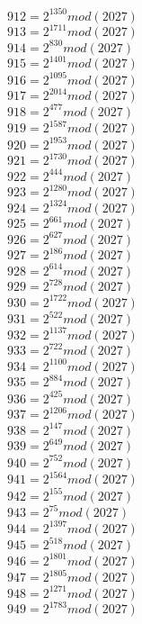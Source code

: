 \documentclass[12pt, letterpaper]{article}
\begin{document}
\begin{itemize}
\begin{multicols}{3}
$912= 2^{1350} mod (2027)$\\
$913= 2^{1711} mod (2027)$\\
$914= 2^{830} mod (2027)$\\
$915= 2^{1401} mod (2027)$\\
$916= 2^{1095} mod (2027)$\\
$917= 2^{2014} mod (2027)$\\
$918= 2^{477} mod (2027)$\\
$919= 2^{1587} mod (2027)$\\
$920= 2^{1953} mod (2027)$\\
$921= 2^{1730} mod (2027)$\\
$922= 2^{444} mod (2027)$\\
$923= 2^{1280} mod (2027)$\\
$924= 2^{1324} mod (2027)$\\
$925= 2^{661} mod (2027)$\\
$926= 2^{627} mod (2027)$\\
$927= 2^{186} mod (2027)$\\
$928= 2^{614} mod (2027)$\\
$929= 2^{728} mod (2027)$\\
$930= 2^{1722} mod (2027)$\\
$931= 2^{522} mod (2027)$\\
$932= 2^{1137} mod (2027)$\\
$933= 2^{722} mod (2027)$\\
$934= 2^{1100} mod (2027)$\\
$935= 2^{884} mod (2027)$\\
$936= 2^{425} mod (2027)$\\
$937= 2^{1206} mod (2027)$\\
$938= 2^{147} mod (2027)$\\
$939= 2^{649} mod (2027)$\\
$940= 2^{752} mod (2027)$\\
$941= 2^{1564} mod (2027)$\\
$942= 2^{155} mod (2027)$\\
$943= 2^{75} mod (2027)$\\
$944= 2^{1397} mod (2027)$\\
$945= 2^{518} mod (2027)$\\
$946= 2^{1801} mod (2027)$\\
$947= 2^{1805} mod (2027)$\\
$948= 2^{1271} mod (2027)$\\
$949= 2^{1783} mod (2027)$\\

\end{multicols}
\end{itemize}
\end{document}
